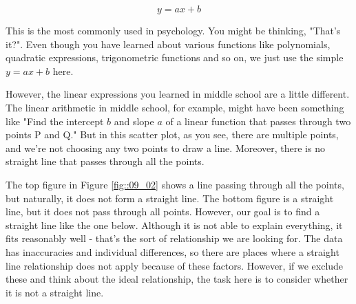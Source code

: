 \documentclass{ltjbook}
\begin{document}

\[ y = ax + b \]

This is the most commonly used  in psychology. You might be thinking, "That's it?". Even though you have learned about various functions like polynomials, quadratic expressions, trigonometric functions and so on, we just use the simple $y=ax+b$ here.

However, the linear expressions you learned in middle school are a little different. The linear arithmetic in middle school, for example, might have been something like "Find the intercept $b$ and slope $a$ of a linear function that passes through two points P and Q." But in this scatter plot, as you see, there are multiple points, and we're not choosing any two points to draw a line. Moreover, there is no straight line that passes through all the points.



The top figure in Figure \ref{fig::09_02} shows a line passing through all the points, but naturally, it does not form a straight line. The bottom figure is a straight line, but it does not pass through all points. However, our goal is to find a straight line like the one below. Although it is not able to explain everything, it fits reasonably well - that's the sort of relationship we are looking for. The data has inaccuracies and individual differences, so there are places where a straight line relationship does not apply because of these factors. However, if we exclude these and think about the ideal relationship, the task here is to consider whether it is not a straight line.
\end{document}
